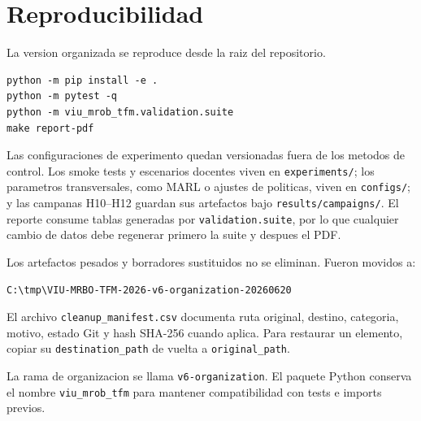 ﻿\section{Reproducibilidad}

La version organizada se reproduce desde la raiz del repositorio.

\begin{verbatim}
python -m pip install -e .
python -m pytest -q
python -m viu_mrob_tfm.validation.suite
make report-pdf
\end{verbatim}

Las configuraciones de experimento quedan versionadas fuera de los metodos de control.
Los smoke tests y escenarios docentes viven en \texttt{experiments/}; los parametros
transversales, como MARL o ajustes de politicas, viven en \texttt{configs/}; y las
campanas H10--H12 guardan sus artefactos bajo \texttt{results/campaigns/}. El reporte
consume tablas generadas por \texttt{validation.suite}, por lo que cualquier cambio de
datos debe regenerar primero la suite y despues el PDF.

Los artefactos pesados y borradores sustituidos no se eliminan. Fueron movidos a:

\begin{verbatim}
C:\tmp\VIU-MRBO-TFM-2026-v6-organization-20260620
\end{verbatim}

El archivo \texttt{cleanup\_manifest.csv} documenta ruta original, destino, categoria,
motivo, estado Git y hash SHA-256 cuando aplica. Para restaurar un elemento, copiar su
\texttt{destination\_path} de vuelta a \texttt{original\_path}.

La rama de organizacion se llama \texttt{v6-organization}. El paquete Python conserva el
nombre \texttt{viu\_mrob\_tfm} para mantener compatibilidad con tests e imports previos.
